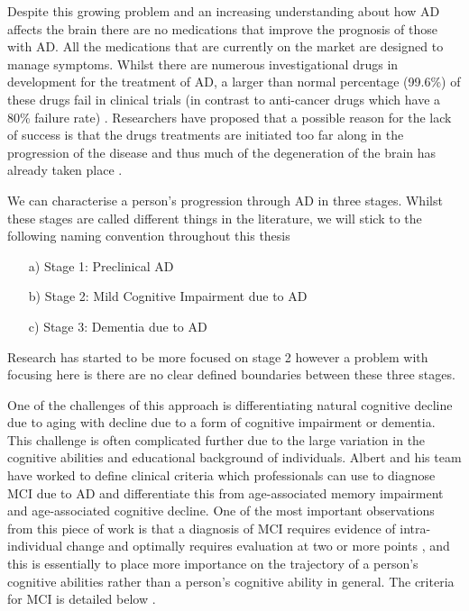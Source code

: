 \documentclass[10pt, letterpaper, twoside, openany]{thesis}
\begin{document}
\par
Despite this growing problem and an increasing understanding about how AD affects the brain there are no medications that improve the prognosis of those with AD. All the medications that are currently on the market are designed to manage symptoms. Whilst there are numerous investigational drugs in development for the treatment of AD, a larger than normal percentage (99.6\%) of these drugs fail in clinical trials (in contrast to anti-cancer drugs which have a 80\% failure rate) \cite{Cummings2014}. Researchers have proposed that a possible reason for the lack of success is that the drugs treatments are initiated too far along in the progression of the disease and thus much of the degeneration of the brain has already taken place \cite{Cummings2014}. 
\par
We can characterise a person's progression through AD in three stages. Whilst these stages are called different things in the literature, we will stick to the following naming convention throughout this thesis
\begin{enumerate}
	\item[a)] Stage 1: Preclinical AD
	\item[b)] Stage 2: Mild Cognitive Impairment due to AD
	\item[c)] Stage 3: Dementia due to AD
\end{enumerate}
Research has started to be more focused on stage 2 however a problem with focusing here is there are no clear defined boundaries between these three stages.
\par
One of the challenges of this approach is differentiating natural cognitive decline due to aging with decline due to a form of cognitive impairment or dementia. This challenge is often complicated further due to the large variation in the cognitive abilities and educational background of individuals. Albert and his team have worked to define clinical criteria which professionals can use to diagnose MCI due to AD and differentiate this from age-associated memory impairment and age-associated cognitive decline.  One of the most important observations from this piece of work is that a diagnosis of MCI requires evidence of intra-individual change and optimally requires evaluation at two or more points \cite{Albert2011}, and this is essentially to place more importance on the trajectory of a person's cognitive abilities rather than a person's cognitive ability in general. The criteria for MCI is detailed below \cite{Albert2011}.
\end{document}
